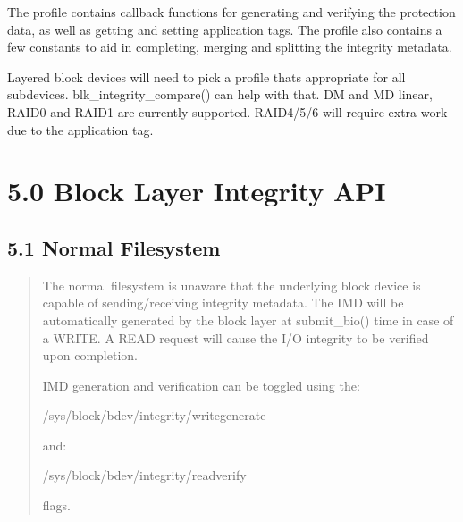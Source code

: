 \documentclass[a4paper,11pt,english]{sphinxmanual}
\begin{document}
The profile contains callback functions for generating and verifying
the protection data, as well as getting and setting application tags.
The profile also contains a few constants to aid in completing,
merging and splitting the integrity metadata.

Layered block devices will need to pick a profile that\textquotesingle{}s appropriate
for all subdevices.  blk\_integrity\_compare() can help with that.  DM
and MD linear, RAID0 and RAID1 are currently supported.  RAID4/5/6
will require extra work due to the application tag.


\section{5.0 Block Layer Integrity API}
\label{\detokenize{data-integrity:block-layer-integrity-api}}

\subsection{5.1 Normal Filesystem}
\label{\detokenize{data-integrity:normal-filesystem}}\begin{quote}

The normal filesystem is unaware that the underlying block device
is capable of sending/receiving integrity metadata.  The IMD will
be automatically generated by the block layer at submit\_bio() time
in case of a WRITE.  A READ request will cause the I/O integrity
to be verified upon completion.

IMD generation and verification can be toggled using the:

\begin{sphinxVerbatim}[commandchars=\\\{\}]
/sys/block/\PYGZlt{}bdev\PYGZgt{}/integrity/write\PYGZus{}generate
\end{sphinxVerbatim}

and:

\begin{sphinxVerbatim}[commandchars=\\\{\}]
/sys/block/\PYGZlt{}bdev\PYGZgt{}/integrity/read\PYGZus{}verify
\end{sphinxVerbatim}

flags.
\end{quote}
\end{document}
